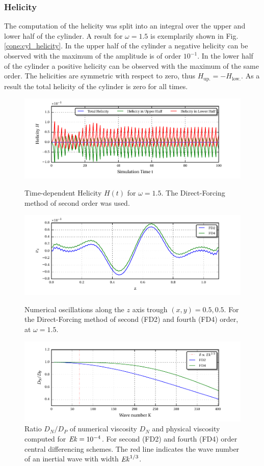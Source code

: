 \subsubsection{Helicity}

The computation of the helicity was split into an integral over the upper and lower half
of the cylinder.  A result for $\omega=1.5$ is exemplarily shown in Fig. \ref{cone:cyl_helicity}.
In the upper half of the cylinder a negative helicity can be observed with the maximum of the amplitude is of order $10^{-1}$.
In the lower half of the cylinder a positive helicity can be observed with the maximum of the same order.
The helicities are symmetric with respect to zero, thus $H_{\text{up.}} = -H_{\text{low.}}$.
As a result the total helicity of the cylinder is zero for all times.

\begin{figure}[!p]
  \centering
  \includegraphics{gfx/cone/cylinder/helicity.pdf}  \caption{
      Time-dependent Helicity $H(t)$ for $\omega=1.5$. The Direct-Forcing method of second order was used.
      \label{cone:cyl_helicity}
      }
  \centering
  \includegraphics{gfx/cone/cylinder/oscillations.pdf}  \caption{
      Numerical oscillations along the $z$ axis trough $(x,y) = 0.5, 0.5$.
      For the Direct-Forcing method of second (FD2) and fourth (FD4) order, at $\omega=1.5$.
      \label{cone:cyl_oscillations}
      }
  \centering
  \includegraphics{gfx/cone/cylinder/numvis.pdf}  \caption{
      Ratio $D_N/D_P$ of  numerical viscosity  $D_N$ and physical viscosity computed for $\mbox{\textit{Ek}}=10^{-4}$. For second (FD2) and fourth (FD4) order central differencing schemes.
      The red line indicates the wave number of an inertial wave with width $\mbox{\textit{Ek}}^{1/3}$.
      \label{cone:cyl_numvis}
      }
\end{figure}

